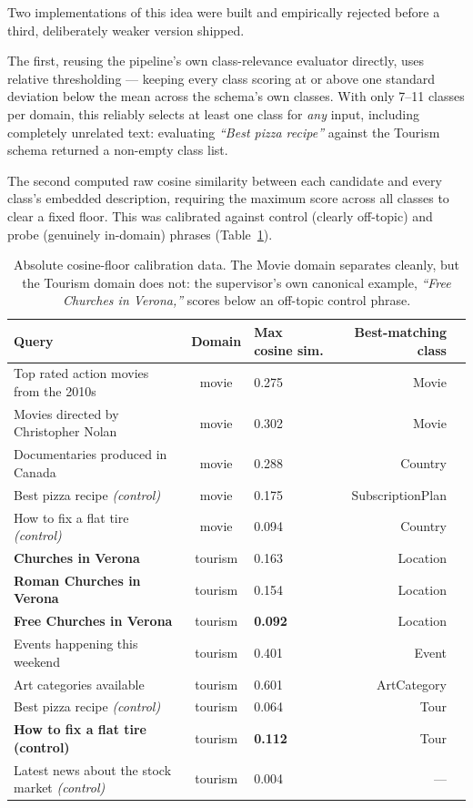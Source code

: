 Two implementations of this idea were built and empirically rejected before a third, deliberately
weaker version shipped.

The first, reusing the pipeline's own class-relevance evaluator directly, uses relative
thresholding --- keeping every class scoring at or above one standard deviation below the mean
across the schema's own classes. With only 7--11 classes per domain, this reliably selects at least
one class for \emph{any} input, including completely unrelated text: evaluating \emph{``Best pizza
recipe''} against the Tourism schema returned a non-empty class list.

The second computed raw cosine similarity between each candidate and every class's embedded
description, requiring the maximum score across all classes to clear a fixed floor. This was
calibrated against control (clearly off-topic) and probe (genuinely in-domain) phrases
(Table~\ref{tab:rec-calibration}).

\begin{table}[H]
\centering
\begin{tabular}{lclr l}
\toprule
\textbf{Query} & \textbf{Domain} & \textbf{Max cosine sim.} & \textbf{Best-matching class} \\
\midrule
Top rated action movies from the 2010s        & movie    & 0.275 & Movie \\
Movies directed by Christopher Nolan          & movie    & 0.302 & Movie \\
Documentaries produced in Canada              & movie    & 0.288 & Country \\
Best pizza recipe \emph{(control)}            & movie    & 0.175 & SubscriptionPlan \\
How to fix a flat tire \emph{(control)}       & movie    & 0.094 & Country \\
\textbf{Churches in Verona}                   & tourism  & 0.163 & Location \\
\textbf{Roman Churches in Verona}             & tourism  & 0.154 & Location \\
\textbf{Free Churches in Verona}              & tourism  & \textbf{0.092} & Location \\
Events happening this weekend                 & tourism  & 0.401 & Event \\
Art categories available                      & tourism  & 0.601 & ArtCategory \\
Best pizza recipe \emph{(control)}            & tourism  & 0.064 & Tour \\
\textbf{How to fix a flat tire (control)}     & tourism  & \textbf{0.112} & Tour \\
Latest news about the stock market \emph{(control)} & tourism & 0.004 & --- \\
\bottomrule
\end{tabular}
\caption{Absolute cosine-floor calibration data. The Movie domain separates cleanly, but the
Tourism domain does not: the supervisor's own canonical example, \emph{``Free Churches in
Verona,''} scores below an off-topic control phrase.}
\label{tab:rec-calibration}
\end{table}

